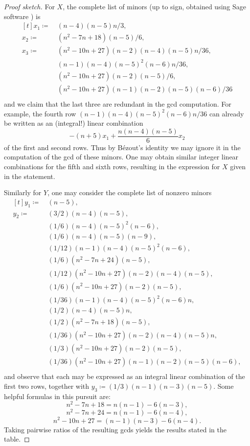 \begin{proof}[{\it Proof sketch}]
For $X$, the complete list of minors (up to sign, obtained using Sage software \cite{sagemath}) is
\[ \begin{aligned}[t] 
 x_1 \coloneqq \ & (n - 4)(n - 5)n/3, \\[-.3em]
 x_2 \coloneqq \ & (n^2 - 7n + 18)(n - 5)/6, \\[-.3em]
 x_3 \coloneqq \ & (n^2 - 10n + 27)(n - 2)(n - 4)(n - 5)n/36, \\[-.3em]
 & (n - 1)(n - 4)(n - 5)^2(n - 6)n/36, \\[-.3em]
 & (n^2 - 10n + 27)(n - 2)(n - 5)/6, \\[-.3em]
 & (n^2 - 10n + 27)(n - 1)(n - 2)(n - 5)(n - 6)/36 \\[-.3em]
\end{aligned} \]
and we claim that the last three are redundant in the gcd computation.  For example, the fourth row $(n - 1)(n - 4)(n - 5)^2(n - 6)n/36$ can already be written as an (integral!) linear combination 
\[ -(n+5)x_1 + \frac{n(n-4)(n-5)}{6} x_2 \]
of the first and second rows.  Thus by B\'ezout's identity we may ignore it in the computation of the gcd of these minors.  One may obtain similar integer linear combinations for the fifth and sixth rows, resulting in the expression for $X$ given in the statement.

Similarly for $Y$, one may consider the complete list of nonzero minors
\[ \begin{aligned}[t] 
 y_1 \coloneqq \ & (n - 5), \\[-.3em]
 y_2 \coloneqq \ & (3/2)(n - 4)(n - 5), \\[-.3em]
 & (1/6)(n - 4)(n - 5)^2(n - 6), \\[-.3em]
 & (1/6)(n - 4)(n - 5)(n - 9), \\[-.3em]
 & (1/12)(n - 1)(n - 4)(n - 5)^2(n - 6), \\[-.3em]
 & (1/6)(n^2 - 7n + 24)(n - 5), \\[-.3em]
 & (1/12)(n^2 - 10n + 27)(n - 2)(n - 4)(n - 5), \\[-.3em]
 & (1/6)(n^2 - 10n + 27)(n - 2)(n - 5), \\[-.3em]
 & (1/36)(n - 1)(n - 4)(n - 5)^2(n - 6)n, \\[-.3em]
 & (1/2)(n - 4)(n - 5)n, \\[-.3em]
 & (1/2)(n^2 - 7n + 18)(n - 5), \\[-.3em]
 & (1/36)(n^2 - 10n + 27)(n - 2)(n - 4)(n - 5)n, \\[-.3em]
 & (1/3)(n^2 - 10n + 27)(n - 2)(n - 5), \\[-.3em]
 & (1/36)(n^2 - 10n + 27)(n - 1)(n - 2)(n - 5)(n - 6), \\[-.3em]
\end{aligned} \]
and observe that each may be expressed as an integral linear combination of the first two rows, together with $y_3 \coloneqq  (1/3)(n-1)(n-3)(n-5)$.  Some helpful formulas in this pursuit are:
\[ n^2 - 7n + 18 = n(n-1)-6(n-3), \]
\[ n^2 - 7n + 24 = n(n-1)-6(n-4), \]
\[ n^2 - 10n + 27 = (n-1)(n-3)-6(n-4). \]
Taking pairwise ratios of the resulting gcds yields the results stated in the table.
\end{proof}

